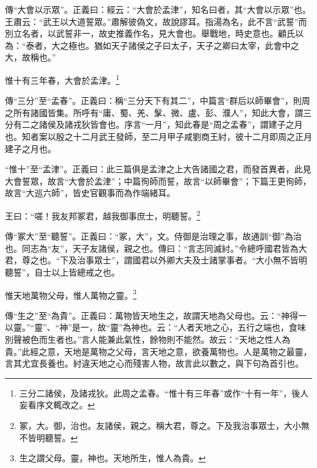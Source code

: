 {\noindent\shu{}\fzkt 傳“大會以示眾”。正義曰：經云：“大會於孟津”，知名曰者，其“大會以示眾”也。王肅云：“武王以大道誓眾。”肅解彼偽文，故說謬耳。指湯為名，此不言“武誓”而別立名者，以武誓非一，故史推義作名，見大會也。舉戰地，時史意也。顧氏以為：“泰者，大之極也。猶如天子諸侯之子曰太子，天子之卿曰太宰，此會中之大，故稱也。” \par}

惟十有三年春，大會於孟津。\footnote{三分二諸侯，及諸戎狄。此周之孟春。“惟十有三年春”或作“十有一年”，後人妄看序文輒改之。}

{\noindent\zhuan{}\fzbyks 傳“三分”至“孟春”。正義曰：稱“三分天下有其二”，中篇言“群后以師畢會”，則周之所有諸國皆集。所呼有“庸、蜀、羌、髳、微、盧、彭、濮人”，知此大會，謂三分有二之諸侯及諸戎狄皆會也。序言“一月”，知此春是“周之孟春”，謂建子之月也。知者案以殷之十二月武王發師，至二月甲子咸劉商王紂，彼十二月即周之正月建子之月也。 \par}

{\noindent\shu{}\fzkt “惟十”至“孟津”。正義曰：此三篇俱是孟津之上大告諸國之君，而發首異者，此見大會誓眾，故言“大會於孟津”；中篇徇師而誓，故言“以師畢會”；下篇王更徇師，故言“大巡六師”，皆史官觀事而為作端緒耳。 \par}

王曰：“嗟！我友邦冢君，越我御事庶士，明聽誓。\footnote{冢，大。御，治也。友諸侯，親之。稱大君，尊之。下及我治事眾士，大小無不皆明聽誓。}

{\noindent\zhuan{}\fzbyks 傳“冢大”至“聽誓”。正義曰：“冢，大”，文。侍御是治理之事，故通訓“御”為治也。同志為“友”，天子友諸侯，親之也。傳曰：“言志同滅紂。”令總呼國君皆為大君，尊之也。“下及治事眾士”，謂國君以外卿大夫及士諸掌事者。“大小無不皆明聽誓”，自士以上皆總戒之也。 \par}

惟天地萬物父母，惟人萬物之靈。\footnote{生之謂父母。靈，神也。天地所生，惟人為貴。}

{\noindent\zhuan{}\fzbyks 傳“生之”至“為貴”。正義曰：萬物皆天地生之，故謂天地為父母也。云：“神得一以靈。”“靈”、“神”是一，故“靈”為神也。云：“人者天地之心，五行之端也，食味別聲被色而生者也。”言人能兼此氣性，餘物則不能然。故云：“天地之性人為貴。”此經之意，天地是萬物之父母，言天地之意，欲養萬物也。人是萬物之最靈，言其尤宜長養也。紂違天地之心而殘害人物，故言此以數之，與下句為首引也。 \par}


